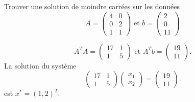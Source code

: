 \begin{example}
\label{exe:4}
Trouver une solution de moindre carrées sur les données 
\begin{displaymath}
  A =
  \begin{pmatrix}
    4 & 0 \\ 0 &2 \\ 1 & 1
  \end{pmatrix}
\text{ et }  b =
\begin{pmatrix}
  2\\0\\11
\end{pmatrix}
\end{displaymath}  

\begin{displaymath}
  A^T A =
  \begin{pmatrix}
    17 & 1 \\
    1 & 5
  \end{pmatrix} \text{ et } A^T b =
  \begin{pmatrix}
    19 \\ 11
  \end{pmatrix}. 
\end{displaymath}
La solution du système 
\begin{displaymath}
   \begin{pmatrix}
    17 & 1 \\
    1 & 5
  \end{pmatrix}
  \begin{pmatrix}
    x_1\\x_2
  \end{pmatrix}
= \begin{pmatrix}
    19 \\ 11
  \end{pmatrix}.
\end{displaymath}
est $x^* = (1,2)^T$. 
\end{example}











